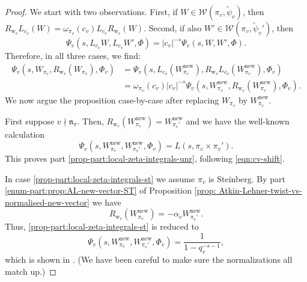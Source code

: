\documentclass[10pt, twoside]{amsart}
\theoremstyle{plain}
\theoremstyle{definition}
\theoremstyle{remark}
\numberwithin{equation}{subsection}
\def\new{\mathrm{new}}
\def\gn{\mathfrak n}
\def\calw{\mathcal W}
\begin{document}
\begin{proof}
We start with two observations. First, if $W \in \calw(\pi_v,\widetilde \psi_v)$, then $R_{{ \boldsymbol{\mathrm{w}}}_v}L_{c_v}(W) = \omega_{\pi_v}(c_v)L_{c_v}R_{{ \boldsymbol{\mathrm{w}}}_v}(W)$. Second, if also $W' \in \calw(\pi_v,\widetilde \psi_v')$, then
\begin{equation*}
\Psi_v(s,L_{c_v}W,L_{c_v}W',\Phi) = |c_v|^{-s} \Psi_v(s,W,W',\Phi).
\end{equation*}
Therefore, in all three cases, we find:
\begin{align}\label{eqn:cv-shift}
\Psi_v(s,W_{\pi_v},R_{{ \boldsymbol{\mathrm{w}}}_v}(W_{\pi_v}),\Phi_v) &= \Psi_v(s,L_{c_v}(W_{\pi_v}^{\new}),R_{{ \boldsymbol{\mathrm{w}}}_v}L_{c_v}(W_{\pi_v}^{\new}),\Phi_v)\\
&= \omega_{\pi_v}(c_v)|c_v|^{-s}\Psi_v(s,W_{\pi_v}^{\new},R_{{ \boldsymbol{\mathrm{w}}}_v}(W_{\pi_v}^{\new}),\Phi_v).\nonumber
\end{align}
We now argue the proposition case-by-case after replacing $W_{\pi_v}$ by $W_{\pi_v}^{\new}$.

First suppose $v \nmid \gn_{\pi}$. Then, $R_{{ \boldsymbol{\mathrm{w}}}_v}(W_{\pi_v}^{\new}) = W_{\pi_v'}^{\new}$ and we have the well-known calculation
\begin{equation*}
\Psi_v(s,W_{\pi_v}^{\new},W_{\pi_v'}^{\new},\Phi_v) = L(s,\pi_v\times \pi_v').
\end{equation*}
This proves part \ref{prop-part:local-zeta-integrals-unr}, following \eqref{eqn:cv-shift}.

In case \ref{prop-part:local-zeta-integrals-st} we assume $\pi_v$ is Steinberg. By part \ref{enum-part:prop:AL-new-vector-ST} of Proposition \ref{prop: Atkin-Lehner-twist-vs-normalised-new-vector} we have
\begin{equation*}
R_{{ \boldsymbol{\mathrm{w}}}_v}(W_{\pi_v}^{\new}) = -\alpha_vW_{\pi_v'}^{\new}.
\end{equation*}
Thus, \ref{prop-part:local-zeta-integrals-st} is reduced to
\begin{equation*}
\Psi_v(s,W_{\pi_v}^{\new},W_{\pi_v'}^{\new},\Phi_v) = \frac{1}{1-q_v^{-s-1}},
\end{equation*}
which is shown in \cite[p.\ 306]{Grenie}. (We have been careful to make sure the normalizations all match up.)


\end{proof}
\end{document}
